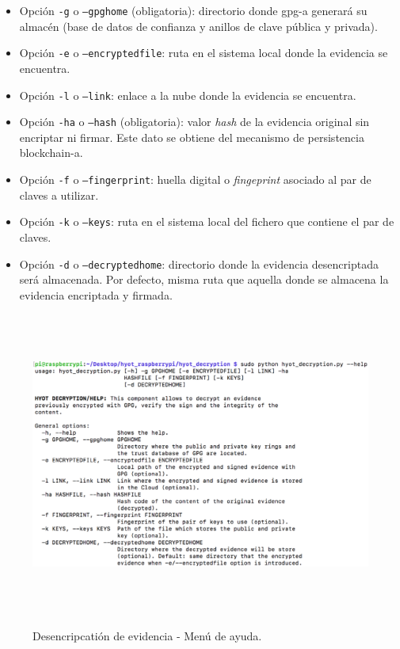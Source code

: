 \documentclass[12pt,a4paper, twoside]{report}
\begin{document}
	\begin{itemize}
		\item Opción \texttt{-g} o \texttt{--gpghome} (obligatoria): directorio donde \gls{gpg-a} generará su almacén (base de datos de confianza y anillos de clave pública y privada).
		\item Opción \texttt{-e} o \texttt{--encryptedfile}: ruta en el sistema local donde la evidencia se encuentra.
		\item Opción \texttt{-l} o \texttt{--link}: enlace a la nube donde la evidencia se encuentra.
		\item Opción \texttt{-ha} o \texttt{--hash} (obligatoria): valor \textit{hash} de la evidencia original sin encriptar ni firmar. Este dato se obtiene del mecanismo de persistencia \gls{blockchain-a}.
		\item Opción \texttt{-f} o \texttt{--fingerprint}: huella digital o \textit{fingeprint} asociado al par de claves a utilizar.
		\item Opción \texttt{-k} o \texttt{--keys}: ruta en el sistema local del fichero que contiene el par de claves. 
		\item Opción \texttt{-d} o \texttt{--decryptedhome}: directorio donde la evidencia desencriptada será almacenada. Por defecto, misma ruta que aquella donde se almacena la evidencia encriptada y firmada.
	\end{itemize}

	\begin{figure}[!ht]   
		\caption{Desencripcatión de evidencia - Menú de ayuda.} 
		\begin{center} 
			\includegraphics[width=16cm,height=10cm]{Images/userGuide/evidence/help} \\
			\label{fig:userguide_evidence_help} 
		\end{center}  
	\end{figure}
		 
\end{document}
